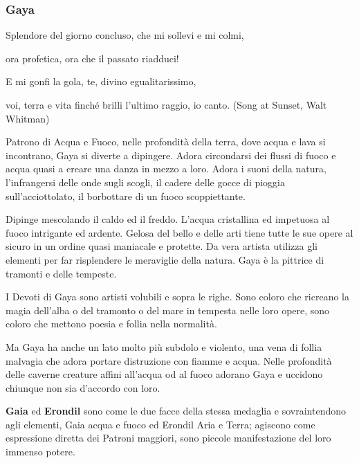 \begin{multicols}{2}
\subsubsection{Gaya}\label{gaya}\hypertarget{gaya}{}

\begin{changemargin}{0.3cm}{0.3cm}\begin{enfasi}{
{Splendore del giorno concluso, che mi sollevi e mi colmi,

ora profetica, ora che il passato riadduci!

E mi gonfi la gola, te, divino egualitarissimo,

voi, terra e vita finché brilli l'ultimo raggio, io canto. (Song at Sunset, Walt Whitman)}
}\end{enfasi}\end{changemargin}\medskip

Patrono di Acqua e Fuoco, nelle profondità della terra, dove acqua e lava si incontrano, Gaya si diverte a dipingere. Adora circondarsi dei flussi di fuoco e acqua quasi a creare una danza in mezzo a loro. Adora i suoni della natura, l'infrangersi delle onde sugli scogli, il cadere delle gocce di pioggia sull'acciottolato, il borbottare di un fuoco scoppiettante.

Dipinge mescolando il caldo ed il freddo. L'acqua cristallina ed impetuosa al fuoco intrigante ed ardente. Gelosa del bello e delle arti tiene tutte le sue opere al sicuro in un ordine quasi maniacale e protette. Da vera artista utilizza gli elementi per far risplendere le meraviglie della natura. Gaya è la pittrice di tramonti e delle tempeste.

I Devoti di Gaya sono artisti volubili e sopra le righe. Sono coloro che ricreano la magia dell'alba o del tramonto o del mare in tempesta nelle loro opere, sono coloro che mettono poesia e follia nella normalità.

Ma Gaya ha anche un lato molto più subdolo e violento, una vena di follia malvagia che adora portare distruzione con fiamme e acqua. Nelle profondità delle caverne creature affini all'acqua od al fuoco adorano Gaya e uccidono chiunque non sia d'accordo con loro.

\begin{changemargin}{0.3cm}{0.3cm}\begin{narratore}
\textbf{Gaia} ed \textbf{Erondil} sono come le due facce della stessa medaglia e sovraintendono agli elementi, Gaia acqua e fuoco ed Erondil Aria e Terra; agiscono come espressione diretta dei Patroni maggiori, sono piccole manifestazione del loro immenso potere.
\end{narratore}\end{changemargin}


\end{multicols}
